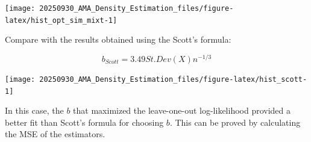 \documentclass[
]{article}
\newenvironment{Shaded}{\begin{snugshade}}{\end{snugshade}}
\newcommand{\AttributeTok}[1]{\textcolor[rgb]{0.13,0.29,0.53}{#1}}
\newcommand{\ConstantTok}[1]{\textcolor[rgb]{0.56,0.35,0.01}{#1}}
\newcommand{\DecValTok}[1]{\textcolor[rgb]{0.00,0.00,0.81}{#1}}
\newcommand{\FloatTok}[1]{\textcolor[rgb]{0.00,0.00,0.81}{#1}}
\newcommand{\FunctionTok}[1]{\textcolor[rgb]{0.13,0.29,0.53}{\textbf{#1}}}
\newcommand{\NormalTok}[1]{#1}
\newcommand{\OtherTok}[1]{\textcolor[rgb]{0.56,0.35,0.01}{#1}}
\newcommand{\SpecialCharTok}[1]{\textcolor[rgb]{0.81,0.36,0.00}{\textbf{#1}}}
\newcommand{\StringTok}[1]{\textcolor[rgb]{0.31,0.60,0.02}{#1}}
\begin{document}
\begin{center}\texttt{[image: 20250930\_AMA\_Density\_Estimation\_files/figure-latex/hist\_opt\_sim\_mixt-1]} \end{center}

Compare with the results obtained using the Scott's formula:

\[ b_{Scott}=3.49St.Dev(X)n^{-1/3} \]

\begin{Shaded}
\end{Shaded}

\begin{center}\texttt{[image: 20250930\_AMA\_Density\_Estimation\_files/figure-latex/hist\_scott-1]} \end{center}

In this case, the \(b\) that maximized the leave-one-out log-likelihood
provided a better fit than Scott's formula for choosing \(b\). This can
be proved by calculating the MSE of the estimators.
\end{document}
